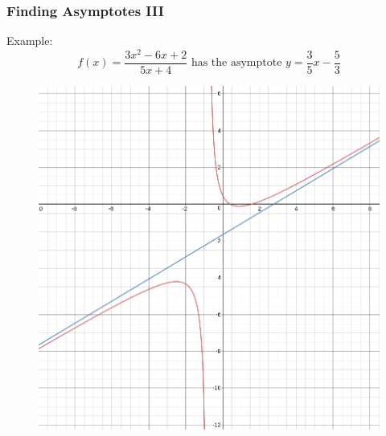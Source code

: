 \documentclass[xcolor=dvipsnames]{beamer}
\begin{document}
\begin{frame}
  \frametitle{Finding Asymptotes III}
Example:
\begin{equation}
  \label{eq:iboohoht}
  f(x)=\frac{3x^{2}-6x+2}{5x+4}\mbox{ has the asymptote }y=\frac{3}{5}x-\frac{5}{3}
\end{equation}
\begin{figure}[h]
\includegraphics[scale=.25]{./diagrams/asymp5.png}
\end{figure}
\end{frame}
\end{document}
